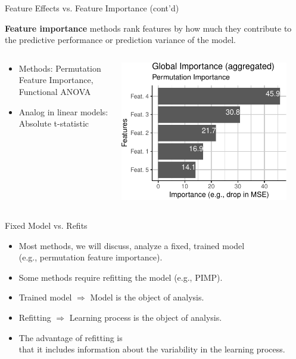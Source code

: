 \documentclass[aspectratio=169]{../latex_main/tntbeamer}  %
\begin{document}
\begin{frame}[c]{Feature Effects vs. Feature Importance (cont'd)}
	
	\textbf{Feature importance} methods rank features by how much they contribute to the predictive performance or prediction variance of the model.
	\begin{columns}
		\begin{column}{0.6\textwidth}
			\begin{itemize}
				\itemsep1em
				\item Methods: Permutation Feature Importance,\\ Functional ANOVA
				\item Analog in linear models: Absolute t-statistic %
			\end{itemize}
		\end{column}
		\begin{column}{0.4\textwidth}
			\begin{center}
				\includegraphics[page=1, width=0.9\textwidth]{figure/feature-importance}
			\end{center}
		\end{column}
	\end{columns}
\end{frame}



\begin{frame}[c]{Fixed Model vs. Refits}
	\begin{itemize}
		\itemsep1em
		\item Most methods, we will discuss, analyze a fixed, trained model\\ 
		(e.g., permutation feature importance).
		\item Some methods require refitting the model (e.g., PIMP).
		\item Trained model $\Rightarrow$ Model is the object of analysis.
		\item Refitting $\Rightarrow$ Learning process is the object of analysis.
		\item The advantage of refitting is\\ that it includes information about the variability in the learning process.
	\end{itemize}
\end{frame}

	
\end{document}
